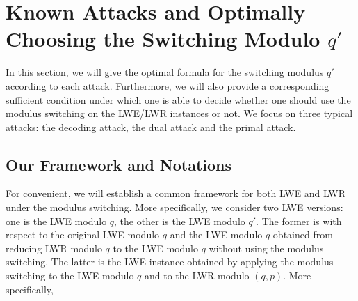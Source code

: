 \documentclass{cta-author}
\begin{document}
\section {Known Attacks and Optimally Choosing  the Switching Modulo $q'$} \label{sec4}

In this section, we will give the optimal formula for the switching modulus $q'$ according to each attack. Furthermore, we will also provide a corresponding sufficient condition under which one is able to decide whether one should use the modulus switching on the LWE/LWR instances or not. We focus on three typical attacks: the decoding  attack, the dual attack and the primal attack. 


\subsection{Our Framework and Notations}\label{sec41}
 For convenient, we will establish a common framework for both LWE and LWR under the modulus switching.  More specifically, we consider two LWE versions: one is the LWE modulo $q$, the other is the LWE modulo $q'$. The former is with respect to the original LWE modulo $q$ and the LWE modulo $q$ obtained from reducing LWR modulo $q$ to the LWE modulo $q$ without using the modulus switching. The latter is the LWE instance obtained by applying the modulus switching to the LWE modulo $q$ and to the LWR modulo $(q,p)$. More specifically,
\end{document}
